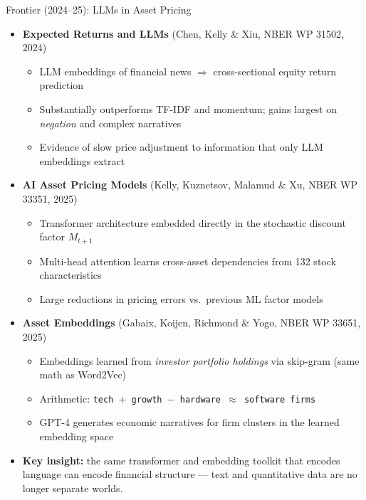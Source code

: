 \begin{frame}{Frontier (2024--25): LLMs in Asset Pricing}
\begin{itemize}
\item \textbf{Expected Returns and LLMs} (Chen, Kelly \& Xiu, NBER WP 31502, 2024)
\begin{itemize}
    \item LLM embeddings of financial news $\Rightarrow$ cross-sectional equity return prediction
    \item Substantially outperforms TF-IDF and momentum; gains largest on \emph{negation} and complex narratives
    \item Evidence of slow price adjustment to information that only LLM embeddings extract
\end{itemize}

\medskip
\item \textbf{AI Asset Pricing Models} (Kelly, Kuznetsov, Malamud \& Xu, NBER WP 33351, 2025)
\begin{itemize}
    \item Transformer architecture embedded directly in the stochastic discount factor $M_{t+1}$
    \item Multi-head attention learns cross-asset dependencies from 132 stock characteristics
    \item Large reductions in pricing errors vs.\ previous ML factor models
\end{itemize}

\medskip
\item \textbf{Asset Embeddings} (Gabaix, Koijen, Richmond \& Yogo, NBER WP 33651, 2025)
\begin{itemize}
    \item Embeddings learned from \emph{investor portfolio holdings} via skip-gram (same math as Word2Vec)
    \item Arithmetic: \texttt{tech $+$ growth $-$ hardware $\approx$ software firms}
    \item GPT-4 generates economic narratives for firm clusters in the learned embedding space
\end{itemize}

\medskip
\item \textbf{Key insight:} the same transformer and embedding toolkit that encodes language can encode financial structure --- text and quantitative data are no longer separate worlds.
\end{itemize}
\end{frame}

